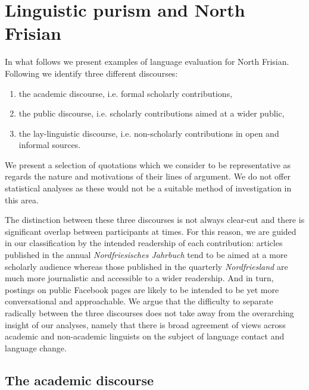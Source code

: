 \documentclass[output=paper]{langsci/langscibook}
\begin{document}
\section{Linguistic purism and North Frisian}
\label{sec:gregersen:5}

In what follows we present examples of language evaluation for North Frisian. Following \citet{Gregersen2019} we identify three different discourses: 

\begin{enumerate}
\item  the academic discourse, i.e. formal scholarly contributions,
\item  the public discourse, i.e. scholarly contributions aimed at a wider public,
\item the lay-linguistic discourse, i.e. non-scholarly contributions in open and informal sources.
\end{enumerate}

We present a selection of quotations which we consider to be representative as regards the nature and motivations of their lines of argument. We do not offer statistical analyses as these would not be a suitable method of investigation in this area. 

The distinction between these three discourses is not always clear-cut and there is significant overlap between participants at times. For this reason, we are guided in our classification by the intended readership of each contribution: articles published in the annual \textit{Nordfriesisches Jahrbuch} tend to be aimed at a more scholarly audience whereas those published in the quarterly \textit{Nordfriesland} are much more journalistic and accessible to a wider readership. And in turn, postings on public Facebook pages are likely to be intended to be yet more conversational and approachable. We argue that the difficulty to separate radically between the three discourses does not take away from the overarching insight of our analyses, namely that there is broad agreement of views across academic and non-academic linguists on the subject of language contact and language change.

\subsection{The academic discourse}
\label{sec:gregersen:5.1}
\end{document}
